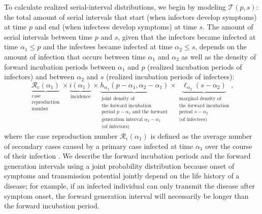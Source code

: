 \documentclass[12pt]{article}
\newcommand{\Rx}[1]{\ensuremath{{\mathcal R}_{#1}}\xspace}
\newcommand{\Rc}{\Rx{\mathrm{c}}}
\newcommand{\psymp}{\ensuremath{p}} %
\newcommand{\ssymp}{\ensuremath{s}} %
\newcommand{\pinf}{\ensuremath{\alpha_1}} %
\newcommand{\sinf}{\ensuremath{\alpha_2}} %
\newcommand{\idist}{\ell} %
\newcommand{\total}{{\mathcal T}} %
\begin{document}
To calculate realized serial-interval distributions, we begin by modeling $\total(\psymp,\ssymp)$: the total amount of serial intervals that start (when infectors develop symptoms) at time $\psymp$ and end (when infectees develop symptoms) at time $\ssymp$.
The amount of serial intervals between time $\psymp$ and $\ssymp$,
given that the infectors became infected at time $\pinf\le\psymp$ and
the infectees became infected at time $\sinf\le\ssymp$, depends on the
amount of infection that occurs between time $\pinf$ and $\sinf$ as
well as the density of forward incubation periods between $\pinf$ and
$\psymp$ (realized incubation periods of infectors) and between
$\sinf$ and $\ssymp$ (realized incubation periods of infectees):
\begin{equation}
\underbrace{\Rc (\pinf)}_{\substack{\text{case} \\ \text{reproduction} \\ \text{number}}} 
\times 
\underbrace{i(\pinf)}_{\text{incidence}} 
\times 
\underbrace{h_{\pinf}(\psymp-\pinf, \sinf - \pinf)}_{\substack{\text{joint density of} \\ \text{the forward incubation} \\ \text{period } p-\pinf \text{ and the forward} \\ \text{generation interval } \sinf-\pinf\\ \text{(of infectors)}}}
\times
\underbrace{\idist_{\sinf}(\ssymp - \sinf)}_{\substack{\text{marginal density of} \\ \text{the forward incubation} \\ \text{period } \ssymp-\sinf \\ \text{(of infectees)}}},
\end{equation}
where the case reproduction number $\Rc (\pinf)$ is defined as the average number of secondary cases caused by a primary case infected at time $\pinf$ over the course of their infection \citep{fraser2007estimating}.
We describe the forward incubation periods and the forward generation intervals using a joint probability distribution because onset of symptoms and transmission potential jointly depend on the life history of a disease;
for example, if an infected individual can only transmit the disease after symptom onset, the forward generation interval will necessarily be longer than the forward incubation period.
\end{document}
